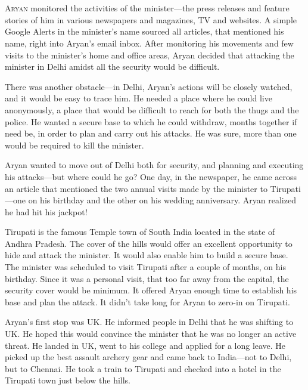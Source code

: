 \chapter{}

\lettrine{A}{ryan} monitored the activities of the minister—the press releases and feature
stories of him in various newspapers and magazines, TV and websites. A simple
Google Alerts in the minister's name sourced all articles, that mentioned his
name, right into Aryan's email inbox. After monitoring his movements and few
visits to the minister's home and office areas, Aryan decided that attacking the
minister in Delhi amidst all the security would be difficult.

There was another obstacle—in Delhi, Aryan's actions will be closely watched,
and it would be easy to trace him. He needed a place where he could live
anonymously, a place that would be difficult to reach for both the thugs and the
police. He wanted a secure base to which he could withdraw, months together if
need be, in order to plan and carry out his attacks. He was sure, more than
one would be required to kill the minister.

Aryan wanted to move out of Delhi both for security, and planning and executing
his attacks—but where could he go? One day, in the newspaper, he came across
an article that mentioned the two annual visits made by the minister to
Tirupati—one on his birthday and the other on his wedding anniversary. Aryan
realized
he had hit his jackpot!

Tirupati is the famous Temple town of South India located in the state of Andhra
Pradesh. The cover of the hills would offer an excellent opportunity to hide and
attack the minister. It would also enable him to build a secure base. The
minister was scheduled to visit Tirupati after a couple of months, on his
birthday. Since it was a personal visit, that too far away from the capital, the
security cover would be minimum. It offered Aryan enough time to establish his
base and plan the attack. It didn't take long for Aryan to zero-in on Tirupati.

Aryan's first stop was UK. He informed people in Delhi that he was shifting to
UK. He hoped this would convince the minister that he was no longer an active
threat. He landed in UK, went to his college and applied for a long leave. He
picked up the best assault archery gear and came back to India—not to Delhi,
but to Chennai. He took a train to Tirupati and checked into a hotel in the
Tirupati town just below the hills.